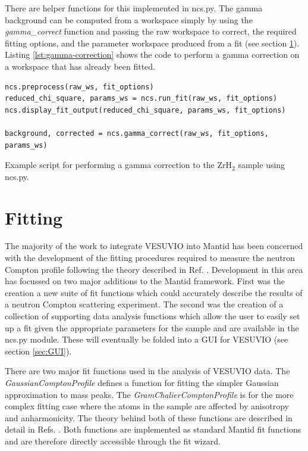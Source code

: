 \documentclass[paper=a4, fontsize=11pt]{scrartcl}	%
\numberwithin{equation}{section}															%
\numberwithin{figure}{section}																%
\numberwithin{table}{section}
\begin{document}
There are helper functions for this implemented in ncs.py. The gamma background can be computed from a workspace simply by using the \textit{gamma\_correct} function and passing the raw workspace to correct, the required fitting options, and the parameter workspace produced from a fit (see section \ref{sec:fitting}). Listing \ref{lst:gamma-correction} shows the code to perform a gamma correction on a workspace that has already been fitted.

\begin{listing}[H]
\begin{verbatim}
ncs.preprocess(raw_ws, fit_options)
reduced_chi_square, params_ws = ncs.run_fit(raw_ws, fit_options)
ncs.display_fit_output(reduced_chi_square, params_ws, fit_options)

background, corrected = ncs.gamma_correct(raw_ws, fit_options, params_ws)
\end{verbatim}
\caption{Example script for performing a gamma correction to the ZrH$_2$ sample using ncs.py.}
\label{lst:gamma-correction}
\end{listing}

\section{Fitting}
\label{sec:fitting}
The majority of the work to integrate VESUVIO into Mantid has been concerned with the development of the fitting procedures required to measure the neutron Compton profile following the theory described in Ref. \citep{mayers2012vesuvio}. Development in this area has focussed on two major additions to the Mantid framework. First was the creation a new suite of fit functions which could accurately describe the results of a neutron Compton scattering experiment. The second was the creation of a collection of supporting data analysis functions which allow the user to easily set up a fit given the appropriate parameters for the sample and are available in the ncs.py module. These will eventually be folded into a GUI for VESUVIO (see section \ref{sec:GUI}).

There are two major fit functions used in the analysis of VESUVIO data. The \textit{GaussianComptonProfile} defines a function for fitting the simpler Gaussian approximation to mass peaks. The \textit{GramChalierComptonProfile} is for the more complex fitting case where the atoms in the sample are affected by anisotropy and anharmonicity. The theory behind both of these functions are described in detail in Refs. \cite{mayers2012vesuvio, andreani2005measurement}. Both functions are implemented as standard Mantid fit functions and are therefore directly accessible through the fit wizard.
\end{document}
